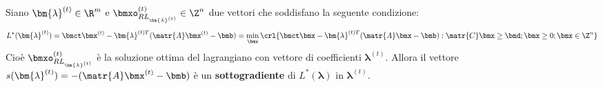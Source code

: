 \documentclass[\main/main.tex]{subfiles}
\begin{document}
\begin{theorem}
    Siano \(\bm{\lambda}^{(t)} \in \R^m\) e \(\bmxo_{RL_{\bm{\lambda}^{(t)}}}^{(t)} \in \Z^n\) due vettori che soddisfano la seguente condizione:
    \[
        L^*(\bm{\lambda}^{(t)})=\bmct\bmx^{(t)} - \bm{\lambda}^{(t)T}(\matr{A}\bmx^{(t)}-\bmb) = \min_{\bmx}\crl{\bmct\bmx-\bm{\lambda}^{(t)T}(\matr{A}\bmx-\bmb): \matr{C}\bmx \geq \bmd; \bmx \geq 0; \bmx \in \Z^n}
    \]    Cioè \(\bmxo^{(t)}_{RL_{\bm{\lambda}^{(t)}}}\) è la soluzione ottima del lagrangiano con vettore di coefficienti \(\bm{\lambda}^{(t)}\). Allora il vettore \(s(\bm{\lambda}^{(t)}) = - (\matr{A}\bmx^{(t)}-\bmb)\) è un \textbf{sottogradiente} di \(L^*(\bm{\lambda})\) in \(\bm{\lambda}^{(t)}\).
\end{theorem}
\end{document}
